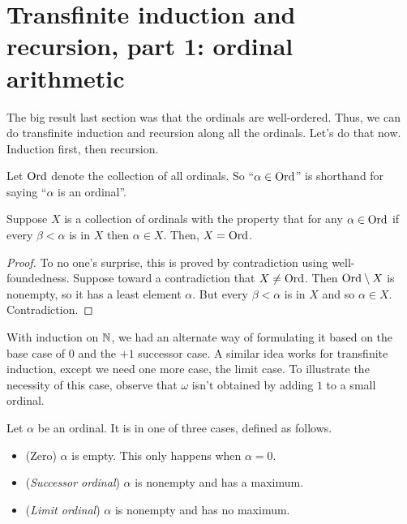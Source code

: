 \documentclass[10pt]{amsart}
\begin{document}
\newpage


\section{Transfinite induction and recursion, part 1: ordinal arithmetic}

The big result last section was that the ordinals are well-ordered. Thus, we can do transfinite induction and recursion along all the ordinals. Let's do that now. Induction first, then recursion.

\begin{definition}
Let $\mathrm{Ord}$ denote the collection of all ordinals. So ``$\alpha \in \mathrm{Ord}$'' is shorthand for saying ``$\alpha$ is an ordinal''.
\end{definition}

\begin{theorem}
Suppose $X$ is a collection of ordinals with the property that for any $\alpha \in \mathrm{Ord}$ if every $\beta < \alpha$ is in $X$ then $\alpha \in X$. Then, $X = \mathrm{Ord}$.
\end{theorem}

\begin{proof}
To no one's surprise, this is proved by contradiction using well-foundedness. Suppose toward a contradiction that $X \ne \mathrm{Ord}$. Then $\mathrm{Ord} \setminus X$ is nonempty, so it has a least element $\alpha$. But every $\beta < \alpha$ is in $X$ and so $\alpha \in X$. Contradiction.
\end{proof}

With induction on $\mathbb{N}$, we had an alternate way of formulating it based on the base case of $0$ and the $+1$ successor case. A similar idea works for transfinite induction, except we need one more case, the limit case. To illustrate the necessity of this case, observe that $\omega$ isn't obtained by adding $1$ to a small ordinal. 

\begin{definition}
Let $\alpha$ be an ordinal. It is in one of three cases, defined as follows.
\begin{itemize}
\item (Zero) $\alpha$ is empty. This only happens when $\alpha = 0$. 
\item (\emph{Successor ordinal}) $\alpha$ is nonempty and has a maximum.
\item (\emph{Limit ordinal}) $\alpha$ is nonempty and has no maximum.
\end{itemize}
\end{definition}
\end{document}
